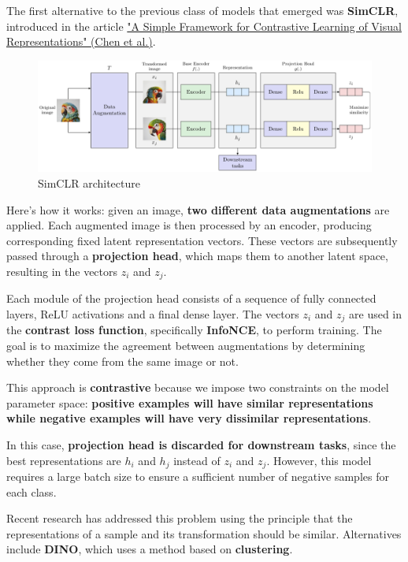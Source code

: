 The first alternative to the previous class of models that emerged was \textbf{SimCLR}, introduced in the article \href{https://arxiv.org/pdf/2002.05709}{"A Simple Framework for Contrastive Learning of Visual Representations" (Chen et al.)}.

\begin{figure}[!htbp]
    \centering
    \includegraphics[width=\linewidth]{tikz/chapter11 - SimCLR.pdf}
    \caption{SimCLR architecture}
\end{figure}

Here's how it works: given an image, \textbf{two different data augmentations} are applied. Each augmented image is then processed by an encoder, producing corresponding fixed latent representation vectors. These vectors are subsequently passed through a \textbf{projection head}, which maps them to another latent space, resulting in the vectors $z_i$ and $z_j$.

Each module of the projection head consists of a sequence of fully connected layers, ReLU activations and a final dense layer. The vectors $z_i$ and $z_j$ are used in the \textbf{contrast loss function}, specifically \textbf{InfoNCE}, to perform training. The goal is to maximize the agreement between augmentations by determining whether they come from the same image or not.

This approach is \textbf{contrastive} because we impose two constraints on the model parameter space: \textbf{positive examples will have similar representations while negative examples will have very dissimilar representations}.

In this case, \textbf{projection head is discarded for downstream tasks}, since the best representations are $h_i$ and $h_j$ instead of $z_i$ and $z_j$. However, this model requires a large batch size to ensure a sufficient number of negative samples for each class.

Recent research has addressed this problem using the principle that the representations of a sample and its transformation should be similar. Alternatives include \textbf{DINO}, which uses a method based on \textbf{clustering}.

